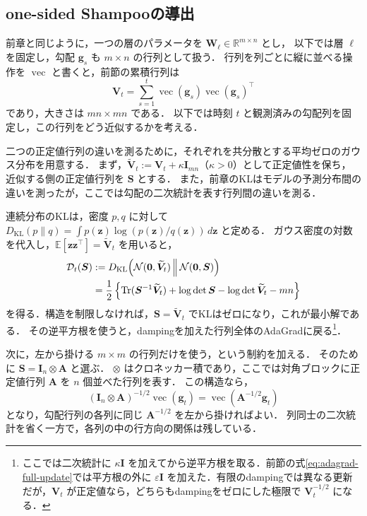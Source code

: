 \documentclass[../main.tex]{subfiles}
\begin{document}
\subsection{one-sided Shampooの導出}

前章と同じように，一つの層のパラメータを $\bm{W}_\ell\in\mathbb{R}^{m\times n}$ とし，
以下では層 $\ell$ を固定し，勾配 $\bm{g}_s$ も $m\times n$ の行列として扱う．
行列を列ごとに縦に並べる操作を $\operatorname{vec}$ と書くと，前節の累積行列は
\begin{equation}
  \bm{V}_t
  =\sum_{s=1}^t\operatorname{vec}(\bm{g}_s)
  \operatorname{vec}(\bm{g}_s)^\top
  \label{eq:adagrad-matrix-second-moment}
\end{equation}
であり，大きさは $mn\times mn$ である．
以下では時刻 $t$ と観測済みの勾配列を固定し，この行列をどう近似するかを考える．

二つの正定値行列の違いを測るために，それぞれを共分散とする平均ゼロのガウス分布を用意する．
まず，$\widetilde{\bm{V}}_t:=\bm{V}_t+\kappa\bm{I}_{mn}$（$\kappa>0$）として正定値性を保ち，
近似する側の正定値行列を $\bm{S}$ とする．
また，前章のKLはモデルの予測分布間の違いを測ったが，ここでは勾配の二次統計を表す行列間の違いを測る．

連続分布のKLは，密度 $p,q$ に対して $D_{\mathrm{KL}}(p\|q)=\int p(\bm{z})\log(p(\bm{z})/q(\bm{z}))\,d\bm{z}$ と定める．
ガウス密度の対数を代入し，$\mathbb{E}[\bm{z}\bm{z}^\top]=\widetilde{\bm{V}}_t$ を用いると，
\begin{align}
  \mathcal{D}_t(\bm{S})
  &:=D_{\mathrm{KL}}\!\left(
  \mathcal{N}(\bm{0},\widetilde{\bm{V}}_t)
  \,\middle\|\,\mathcal{N}(\bm{0},\bm{S})\right)\notag\\
  &=\frac12\left\{
  \operatorname{Tr}(\bm{S}^{-1}\widetilde{\bm{V}}_t)
  +\log\det\bm{S}-\log\det\widetilde{\bm{V}}_t-mn\right\}
  \label{eq:adagrad-gaussian-kl}
\end{align}
を得る．構造を制限しなければ，$\bm{S}=\widetilde{\bm{V}}_t$ でKLはゼロになり，これが最小解である．
その逆平方根を使うと，dampingを加えた行列全体のAdaGradに戻る\footnote{ここでは二次統計に $\kappa\bm{I}$ を加えてから逆平方根を取る．前節の式\eqref{eq:adagrad-full-update}では平方根の外に $\varepsilon\bm{I}$ を加えた．有限のdampingでは異なる更新だが，$\bm{V}_t$ が正定値なら，どちらもdampingをゼロにした極限で $\bm{V}_t^{-1/2}$ になる．}．

次に，左から掛ける $m\times m$ の行列だけを使う，という制約を加える．
そのために $\bm{S}=\bm{I}_n\otimes\bm{A}$ と選ぶ．
$\otimes$ はクロネッカー積であり，ここでは対角ブロックに正定値行列 $\bm{A}$ を $n$ 個並べた行列を表す．
この構造なら，
\begin{equation}
  (\bm{I}_n\otimes\bm{A})^{-1/2}
  \operatorname{vec}(\bm{g}_t)
  =\operatorname{vec}(\bm{A}^{-1/2}\bm{g}_t)
  \label{eq:adagrad-one-sided-action}
\end{equation}
となり，勾配行列の各列に同じ $\bm{A}^{-1/2}$ を左から掛ければよい．
列同士の二次統計を省く一方で，各列の中の行方向の関係は残している．
\end{document}
